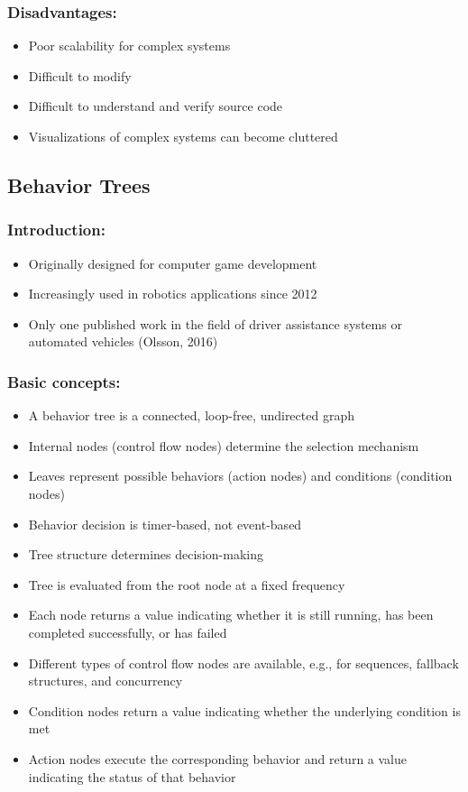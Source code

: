 \subsubsection*{Disadvantages:}
\begin{itemize}
    \item Poor scalability for complex systems
    \item Difficult to modify
    \item Difficult to understand and verify source code
    \item Visualizations of complex systems can become cluttered
\end{itemize}

\subsection{Behavior Trees}

\subsubsection*{Introduction:}
\begin{itemize}
    \item Originally designed for computer game development
    \item Increasingly used in robotics applications since 2012
    \item Only one published work in the field of driver assistance systems or automated vehicles (Olsson, 2016)
\end{itemize}

\subsubsection*{Basic concepts:}
\begin{itemize}
    \item A behavior tree is a connected, loop-free, undirected graph
    \item Internal nodes (control flow nodes) determine the selection mechanism
    \item Leaves represent possible behaviors (action nodes) and conditions (condition nodes)
    \item Behavior decision is timer-based, not event-based
    \item Tree structure determines decision-making
    \item Tree is evaluated from the root node at a fixed frequency
    \item Each node returns a value indicating whether it is still running, has been completed successfully, or has failed
    \item Different types of control flow nodes are available, e.g., for sequences, fallback structures, and concurrency
    \item Condition nodes return a value indicating whether the underlying condition is met
    \item Action nodes execute the corresponding behavior and return a value indicating the status of that behavior
\end{itemize}

